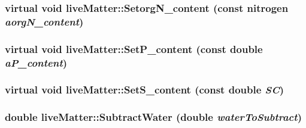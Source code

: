 \label{classlive_matter_ac88e0a589454e8a1aaef82408d737027}
\hypertarget{classlive_matter_adbb45be219dd863cfad2b5e97cde1508}{
\subsubsection[{SetorgN\_\-content}]{\setlength{\rightskip}{0pt plus 5cm}virtual void liveMatter::SetorgN\_\-content (const {\bf nitrogen} {\em aorgN\_\-content})}}
\label{classlive_matter_adbb45be219dd863cfad2b5e97cde1508}
\hypertarget{classlive_matter_a52255cdb24978db665475b5f3a4424a8}{
\subsubsection[{SetP\_\-content}]{\setlength{\rightskip}{0pt plus 5cm}virtual void liveMatter::SetP\_\-content (const double {\em aP\_\-content})}}
\label{classlive_matter_a52255cdb24978db665475b5f3a4424a8}
\hypertarget{classlive_matter_acf54db920b53bc34f1e7878c431ccd0f}{
\subsubsection[{SetS\_\-content}]{\setlength{\rightskip}{0pt plus 5cm}virtual void liveMatter::SetS\_\-content (const double {\em SC})}}
\label{classlive_matter_acf54db920b53bc34f1e7878c431ccd0f}
\hypertarget{classlive_matter_ac03a44e7ff2177c9ab7dc63876b0a6fc}{
\subsubsection[{SubtractWater}]{\setlength{\rightskip}{0pt plus 5cm}double liveMatter::SubtractWater (double {\em waterToSubtract})}}
\label{classlive_matter_ac03a44e7ff2177c9ab7dc63876b0a6fc}


